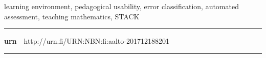 \begin{spacing}{.88}
{\parindent0pt %

\parbox[t]{123.6mm}{\raggedright\small learning environment, pedagogical usability, error classification, automated assessment, teaching mathematics, STACK}

\vspace{.5mm}\rule{\textwidth}{.75pt}

{\fontsize{10.5pt}{10.5pt}\bfseries\sffamily\lsstyle urn}~~{\small http://urn.fi/URN:NBN:fi:aalto-201712188201}

\vspace{-2.4mm}\rule{\textwidth}{.75pt}

} %
\end{spacing}




\newpage
{}
{}


